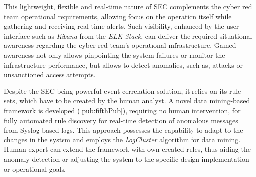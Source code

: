 This lightweight, flexible and real-time nature of SEC complements the cyber red team operational requirements, allowing focus on the operation itself while gathering and receiving real-time alerts. Such visibility, enhanced by the user interface such as \textit{Kibana} from the \textit{ELK Stack}, can deliver the required situational awareness regarding the cyber red team's operational infrastructure. Gained awareness not only allows pinpointing the system failures or monitor the infrastructure performance, but allows to detect anomalies, such as, attacks or unsanctioned access attempts.

Despite the SEC being powerful event correlation solution, it relies on its rule-sets, which have to be created by the human analyst.
A novel data mining-based framework is developed (\ref{pub:fifthPub}), requiring no human intervention, for fully automated rule discovery for real-time detection of anomalous messages from Syslog-based logs. This approach possesses the capability to adapt to the changes in the system and employs the \textit{LogCluster} algorithm for data mining.
Human expert can extend the framework with own created rules, thus aiding the anomaly detection or adjusting the system to the specific design implementation or operational goals.

